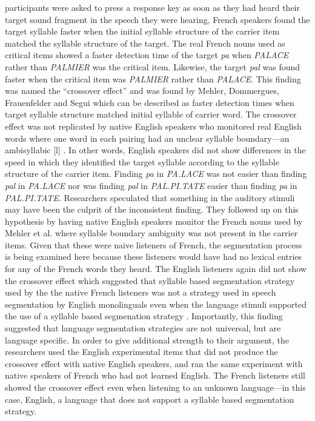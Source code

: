 \documentclass[
12pt, %
english, %
doublespacing, %
nolistspacing, %
liststotoc, %
headsepline, %
chapterinoneline, %
openany, %
]{DoctoralThesis}\usepackage[]{graphicx}\usepackage[]{color}
\begin{document}
participants were asked to press a response key as soon as they had heard their target sound fragment in the speech they were hearing, French speakers found the target syllable faster when the initial syllable structure of the carrier item matched the syllable structure of the target. The real French nouns used as critical items showed a faster detection time of the target \emph{pa} when \emph{PALACE} rather than \emph{PALMIER} was the critical item. Likewise, the target \emph{pal} was found faster when the critical item was \emph{PALMIER} rather than \emph{PALACE}\citep{Mehler1981-vi}. This finding was named the “crossover effect” and was found by Mehler, Dommergues, Frauenfelder and Segui \parencite*{Mehler1981-vi} which can be described as faster detection times when target syllable structure matched initial syllable of carrier word. The crossover effect was not replicated by native English speakers who monitored real English words where one word in each pairing had an unclear syllable boundary---an ambisyllabic [l] \parencite{Cutler1986-zl}. In other words, English speakers did not show differences in the speed in which they identified the target syllable according to the syllable structure of the carrier item. Finding \emph{pa} in \emph{PA.LACE} was not easier than finding \emph{pal} in \emph{PA.LACE} nor was finding \emph{pal} in \emph{PAL.PI.TATE} easier than finding \emph{pa} in \emph{PAL.PI.TATE}. Researchers speculated that something in the auditory stimuli may have been the culprit of the inconsistent finding. They followed up on this hypothesis by having native English speakers monitor the French nouns used by Mehler et al. \parencite*{Mehler1981-vi} where syllable boundary ambiguity was not present in the carrier items. Given that these were naive listeners of French, the segmentation process is being examined here because these listeners would have had no lexical entries for any of the French words they heard. The English listeners again did not show the crossover effect which suggested that syllable based segmentation strategy used by the the native French listeners was not a strategy used in speech segmentation by English monolinguals even when the language stimuli supported the use of a syllable based segmenation strategy \parencite{Cutler1986-zl}. Importantly, this finding suggested that language segmentation strategies are not universal, but are language specific. In order to give additional strength to their argument, the researchers used the English experimental items that did not produce the crossover effect with native English speakers, and ran the same experiment with native speakers of French who had not learned English. The French listeners still showed the crossover effect even when listening to an unknown language—in this case, English, a language that does not support a syllable based segmentation strategy. 
\end{document}
